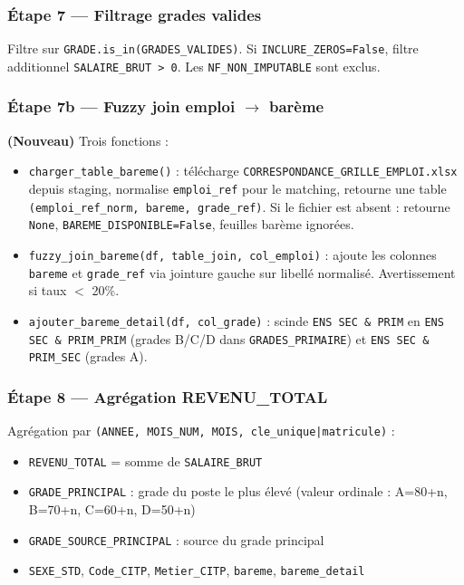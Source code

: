 \documentclass[12pt,a4paper,french]{report}
\begin{document}
\subsubsection{Étape 7 — Filtrage grades valides}

Filtre sur \texttt{GRADE.is\_in(GRADES\_VALIDES)}.
Si \texttt{INCLURE\_ZEROS=False}, filtre additionnel \texttt{SALAIRE\_BRUT > 0}.
Les \texttt{NF\_NON\_IMPUTABLE} sont exclus.

\subsubsection{Étape 7b — Fuzzy join emploi $\rightarrow$ barème}

\textbf{(Nouveau)} Trois fonctions :
\begin{itemize}
  \item \texttt{charger\_table\_bareme()} : télécharge
        \texttt{CORRESPONDANCE\_GRILLE\_EMPLOI.xlsx} depuis staging, normalise
        \texttt{emploi\_ref} pour le matching, retourne une table
        \texttt{(emploi\_ref\_norm, bareme, grade\_ref)}. Si le fichier est
        absent : retourne \texttt{None}, \texttt{BAREME\_DISPONIBLE=False},
        feuilles barème ignorées.
  \item \texttt{fuzzy\_join\_bareme(df, table\_join, col\_emploi)} : ajoute les
        colonnes \texttt{bareme} et \texttt{grade\_ref} via jointure gauche sur
        libellé normalisé. Avertissement si taux $<$ 20\%.
  \item \texttt{ajouter\_bareme\_detail(df, col\_grade)} : scinde
        \texttt{ENS SEC \& PRIM} en \texttt{ENS SEC \& PRIM\_PRIM} (grades B/C/D
        dans \texttt{GRADES\_PRIMAIRE}) et \texttt{ENS SEC \& PRIM\_SEC} (grades A).
\end{itemize}

\subsubsection{Étape 8 — Agrégation REVENU\_TOTAL}

Agrégation par \texttt{(ANNEE, MOIS\_NUM, MOIS, cle\_unique|matricule)} :
\begin{itemize}[nosep]
  \item \texttt{REVENU\_TOTAL} = somme de \texttt{SALAIRE\_BRUT}
  \item \texttt{GRADE\_PRINCIPAL} : grade du poste le plus élevé (valeur
        ordinale : A=80+n, B=70+n, C=60+n, D=50+n)
  \item \texttt{GRADE\_SOURCE\_PRINCIPAL} : source du grade principal
  \item \texttt{SEXE\_STD}, \texttt{Code\_CITP}, \texttt{Metier\_CITP},
        \texttt{bareme}, \texttt{bareme\_detail}
\end{itemize}
\end{document}

